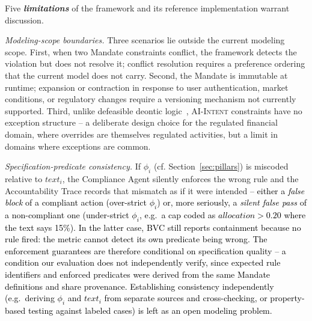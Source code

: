 \documentclass[runningheads]{llncs}
\begin{document}
Five \textbf{\textit{limitations}} of the framework and its reference implementation warrant discussion.

\textit{Modeling-scope boundaries. }
Three scenarios lie outside the current modeling scope. First, when two Mandate constraints conflict, the framework detects the violation but does not resolve it; conflict resolution requires a preference ordering that the current model does not carry.
Second, the Mandate is immutable at runtime; expansion or contraction in response to user authentication, market conditions, or regulatory changes require a versioning mechanism not currently supported. Third, unlike defeasible deontic logic~\cite{governatori2007characterising}, \textsc{AI-Intent} constraints have no exception structure -- a deliberate design choice for the regulated financial domain, where overrides are themselves regulated activities, but a limit in domains where exceptions are common.

\textit{Specification-predicate consistency.} If $\phi_i$ (cf. Section~\ref{sec:pillars}) is miscoded relative to $\mathit{text}_i$, the Compliance Agent silently enforces the wrong rule and the Accountability Trace records that mismatch as if it were intended 
\textcolor{black}{ -- either a \emph{false block} of a compliant action (over-strict $\phi_i$) or, more seriously, a \emph{silent false pass} of a non-compliant one (under-strict $\phi_i$, e.g.\ a cap coded as $\mathit{allocation} > 0.20$ where the text says 15\%). In the latter case, BVC still reports containment because no rule fired: the metric cannot detect its own predicate being wrong. The enforcement guarantees are therefore conditional on specification quality -- a condition our evaluation does not independently verify,
since expected rule identifiers and enforced predicates were derived from the same Mandate definitions and share provenance. Establishing consistency independently (e.g.\ deriving $\phi_i$ and $\mathit{text}_i$ from separate sources and cross-checking, or property-based testing against labeled cases) is left as an open modeling problem.}
\end{document}
